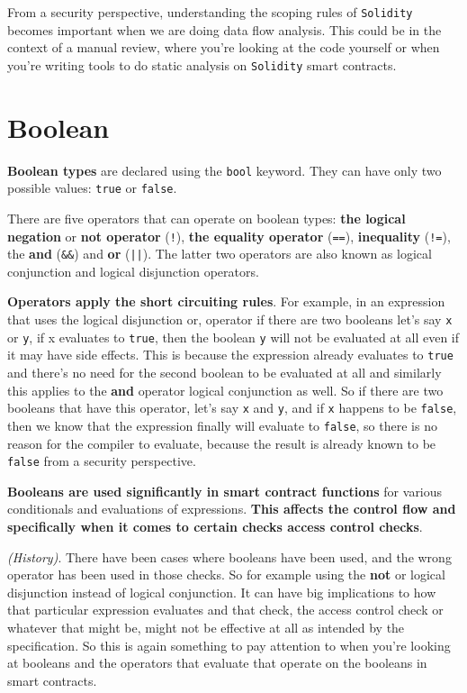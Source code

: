 From a security perspective, understanding the scoping rules of \texttt{Solidity} becomes important when we are doing data flow analysis. This could be in the context of a manual review, where you're looking at the code yourself or when you're writing tools to do static analysis on \texttt{Solidity} smart contracts.

\section{Boolean}

\textbf{Boolean types} are declared using the \texttt{bool} keyword. They can have only two possible values: \texttt{true} or \texttt{false}.

There are five operators that can operate on boolean types: \textbf{the logical negation} or \textbf{not operator} (\texttt{!}), \textbf{the equality operator} (\texttt{==}), \textbf{inequality} (\texttt{!=}), the \textbf{and} (\texttt{\&\&}) and \textbf{or} (\texttt{||}). The latter two operators are also known as logical conjunction and logical disjunction operators.

\textbf{Operators apply the short circuiting rules}. For example, in an expression that uses the logical disjunction or, operator if there are two booleans let's say \texttt{x} or \texttt{y}, if x evaluates to \texttt{true}, then the boolean \texttt{y} will not be evaluated at all even if it may have side effects. This is because the expression already evaluates to \texttt{true} and there's no need for the second boolean to be evaluated at all and similarly this applies to the \textbf{and} operator logical conjunction as well. So if there are two booleans that have this operator, let's say \texttt{x} and \texttt{y}, and if \texttt{x} happens to be \texttt{false}, then we know that the expression finally will evaluate to \texttt{false}, so there is no reason for the compiler to evaluate, because the result is already known to be \texttt{false} from a security perspective. 

\textbf{Booleans are used significantly in smart contract functions} for various conditionals and evaluations of expressions. \textbf{This affects the control flow and specifically when it comes to certain checks access control checks}. 

\textit{(History)}. There have been cases where booleans have been used, and the wrong operator has been used in those checks. So for example using the \textbf{not} or logical disjunction instead of logical conjunction. It can have big implications to how that particular expression evaluates and that check, the access control check or whatever that might be, might not be effective at all as intended by the specification. So this is again something to pay attention to when you're looking at booleans and the operators that evaluate that operate on the booleans in smart contracts.

